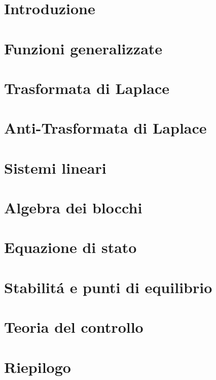 \documentclass{report}
\begin{document}
	
	
	
	\titleTdS
	\pagebreak
	\pagebreak
	\tableofcontents
	\pagebreak
	\listofexercises
	\pagebreak
	\chapter{Introduzione}
		
	\pagebreak
	\chapter{Funzioni generalizzate}
	
	\pagebreak
	\chapter{Trasformata di Laplace}
	
	\pagebreak
	\chapter{Anti-Trasformata di Laplace}
	
	\pagebreak
	\chapter{Sistemi lineari}
	
	
	
	
	
	\pagebreak
	\chapter{Algebra dei blocchi}
	
	
	\pagebreak
	\chapter{Equazione di stato}
	
	\pagebreak
	\chapter{Stabilit\'a e punti di equilibrio}
	
	\pagebreak
	\chapter{Teoria del controllo}
	
	
	
	
	
	\pagebreak
	\chapter{Riepilogo}
	
	
\end{document}

